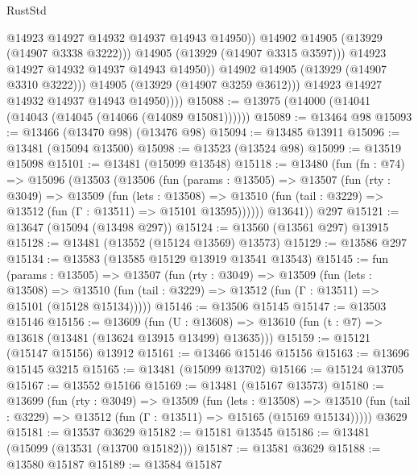\begin{lexlean}{RustStd}
\begin{coremodule}
{\begin{coremodule}
{{{{{{{{{{{{{{{{{{{{{{{{{{{{{{{{{{{{{                            @14923
                            @14927
                            @14932
                            @14937
                            @14943
                            @14950))
                        @14902
                        @14905
                        (@13929 (@14907 @3338 @3222)))
                      @14905
                      (@13929 (@14907 @3315 @3597)))
                    @14923
                    @14927
                    @14932
                    @14937
                    @14943
                    @14950))
                @14902
                @14905
                (@13929 (@14907 @3310 @3222)))
              @14905
              (@13929 (@14907 @3259 @3612)))
            @14923
            @14927
            @14932
            @14937
            @14943
            @14950))))
@15088 := @13975 (@14000 (@14041 (@14043 (@14045 (@14066 (@14089 @15081))))))
@15089 := @13464 @98
@15093 := @13466 (@13470 @98) (@13476 @98)
@15094 := @13485 @13911
@15096 := @13481 (@15094 @13500)
@15098 := @13523 (@13524 @98)
@15099 := @13519 @15098
@15101 := @13481 (@15099 @13548)
@15118 := @13480
    (fun (fn : @74) =>
    @15096
      (@13503
        (@13506
          (fun (params : @13505) =>
          @13507
            (fun (rty : @3049) =>
            @13509
              (fun (lets : @13508) =>
              @13510 (fun (tail : @3229) => @13512 (fun (Γ : @13511) => @15101 @13595))))))
        @13641))
    @297
@15121 := @13647 (@15094 (@13498 @297))
@15124 := @13560 (@13561 @297) @13915
@15128 := @13481 (@13552 (@15124 @13569) @13573)
@15129 := @13586 @297
@15134 := @13583 (@13585 @15129 @13919 @13541 @13543)
@15145 := fun (params : @13505) =>
  @13507
    (fun (rty : @3049) =>
    @13509
      (fun (lets : @13508) =>
      @13510 (fun (tail : @3229) => @13512 (fun (Γ : @13511) => @15101 (@15128 @15134)))))
@15146 := @13506 @15145
@15147 := @13503 @15146
@15156 := @13609
    (fun (U : @13608) => @13610 (fun (t : @7) => @13618 (@13481 (@13624 @13915 @13499) @13635)))
@15159 := @15121 (@15147 @15156) @13912
@15161 := @13466 @15146 @15156
@15163 := @13696 @15145 @3215
@15165 := @13481 (@15099 @13702)
@15166 := @15124 @13705
@15167 := @13552 @15166
@15169 := @13481 (@15167 @13573)
@15180 := @13699
    (fun (rty : @3049) =>
    @13509
      (fun (lets : @13508) =>
      @13510 (fun (tail : @3229) => @13512 (fun (Γ : @13511) => @15165 (@15169 @15134)))))
    @3629
@15181 := @13537 @3629
@15182 := @15181 @13545
@15186 := @13481 (@15099 (@13531 (@13700 @15182)))
@15187 := @13581 @3629
@15188 := @13580 @15187
@15189 := @13584 @15187
}}}}}}}}}}}}}}}}}}}}}}}}}}}}}}}}}}}}}
\end{coremodule}}
\end{coremodule}
\end{lexlean}
